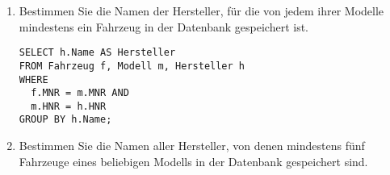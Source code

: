 \documentclass{bschlangaul-aufgabe}
\begin{document}
\begin{enumerate}

\item Bestimmen Sie die Namen der Hersteller, für die von jedem ihrer
Modelle mindestens ein Fahrzeug in der Datenbank gespeichert ist.

\begin{liAntwort}
\begin{verbatim}
SELECT h.Name AS Hersteller
FROM Fahrzeug f, Modell m, Hersteller h
WHERE
  f.MNR = m.MNR AND
  m.HNR = h.HNR
GROUP BY h.Name;
\end{verbatim}
\end{liAntwort}


\item Bestimmen Sie die Namen aller Hersteller, von denen mindestens
fünf Fahrzeuge eines beliebigen Modells in der Datenbank gespeichert
sind.
\end{enumerate}
\end{document}
